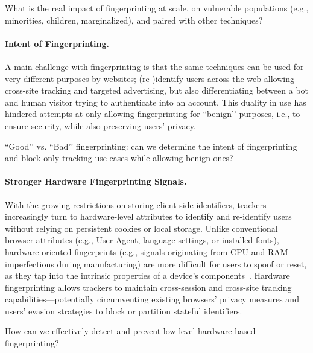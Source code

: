 \begin{opbox}
What is the real impact of fingerprinting at scale, on vulnerable populations (e.g., minorities, children, marginalized), and paired with other techniques?
\end{opbox}

\paragraph{Intent of Fingerprinting.}
A main challenge with fingerprinting is that the same techniques can be used for very different purposes by websites; (re-)identify users across the web allowing cross-site tracking and targeted advertising, but also differentiating between a bot and human visitor trying to authenticate into an account. This duality in use has hindered attempts at only allowing fingerprinting for ``benign’’ purposes, i.e., to ensure security, while also preserving users' privacy.

\begin{opbox}
``Good’’  vs. ``Bad’’ fingerprinting: can we determine the intent of fingerprinting and block only tracking use cases while allowing benign ones? 
\end{opbox}


\paragraph{Stronger Hardware Fingerprinting Signals.}
With the growing restrictions on storing client-side identifiers, trackers increasingly turn to hardware-level attributes to identify and re-identify users without relying on persistent cookies or local storage.
%
Unlike conventional browser attributes (e.g., User-Agent, language settings, or installed fonts), hardware-oriented fingerprints (e.g., signals originating from CPU and RAM imperfections during manufacturing) are more difficult for users to spoof or reset, as they tap into the intrinsic properties of a device’s components~\cite{venugopalanFPRowhammerDRAMBasedDevice2024}.
%
Hardware fingerprinting allows trackers to maintain cross-session and cross-site tracking capabilities---potentially circumventing existing browsers' privacy measures and users' evasion strategies to block or partition stateful identifiers.

\begin{opbox}
How can we effectively detect and prevent low-level hardware-based fingerprinting?
\end{opbox}

